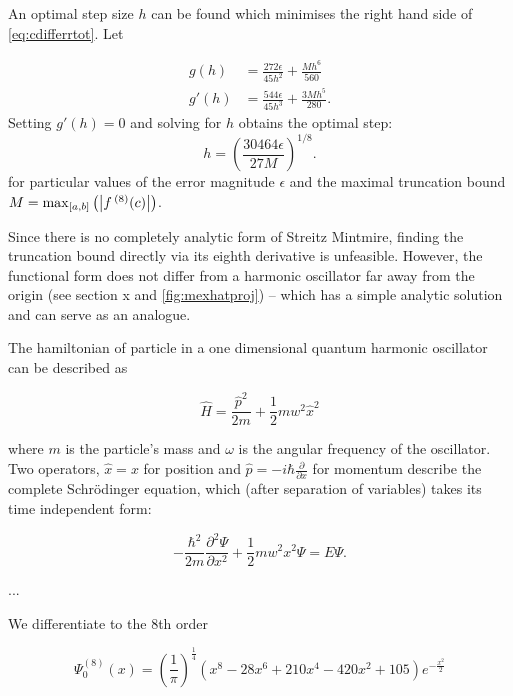 An optimal step size $h$ can be found which minimises the right hand side of \cref{eq:cdifferrtot}. Let

\begin{align}
g(h) &= \frac{272\epsilon}{45h^2}+\frac{Mh^6}{560}\\[0.2cm]
g'(h) &= \frac{544\epsilon}{45h^3}+\frac{3Mh^5}{280}.
\end{align}
Setting $g'(h) = 0$ and solving for $h$ obtains the optimal step:
\begin{equation}
h = \left(\frac{30464\epsilon}{27M}\right)^{1/8}.
\end{equation}
for particular values of the error magnitude $\epsilon$ and the maximal truncation bound $M = \mathrm{max}_{[a,b]}\left(\left\lvert f\,^{(8)}(c)\right\rvert\right)$.

Since there is no completely analytic form of Streitz Mintmire, finding the truncation bound directly via its eighth derivative is unfeasible. However, the functional form does not differ from a harmonic oscillator far away from the origin (see section x and \cref{fig:mexhatproj}) -- which has a simple analytic solution and can serve as an analogue.

The hamiltonian of particle in a one dimensional quantum harmonic oscillator can be described as

\begin{equation}
\widehat{H} = \frac{\widehat{p}^2}{2m}+\frac{1}{2}mw^2\widehat{x}^2
\end{equation}

where $m$ is the particle's mass and $ω$ is the angular frequency of the oscillator. Two operators, $\widehat{x} = x$ for position and $\widehat{p} = -i\hbar \frac{\partial}{\partial x}$ for momentum describe the complete Schr\"{o}dinger equation, which (after separation of variables) takes its time independent form:

\begin{equation}
-\frac{\hbar^2}{2m}\frac{\partial^2 \Psi}{\partial x^2}+\frac{1}{2}mw^2x^2 \Psi = E\Psi.
\end{equation}

...

We differentiate to the 8th order

\begin{equation}
\Psi_0^{(8)}(x) = \left(\frac{1}{\pi}\right)^{\frac{1}{4}}\left(x^8-28x^6+210x^4-420x^2+105\right)e^{-\frac{x^2}{2}}
\label{eq:7pt}
\end{equation}

